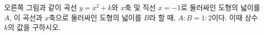\noindent\begin{minipage}[t]{0.58\linewidth}\vspace{0pt}\raggedright 오른쪽 그림과 같이 곡선 $y=x^2+k$와 $x$축 및 직선 $x=-1$로 둘러싸인 도형의 넓이를 $A$, 이 곡선과 $x$축으로 둘러싸인 도형의 넓이를 $B$라 할 때, $A:B=1:2$이다. 이때 상수 $k$의 값을 구하시오.\end{minipage}\hfill\begin{minipage}[t]{0.4\linewidth}\vspace{0pt}\centering \resizebox{\ifdim\width>\linewidth\linewidth\else\width\fi}{!}{}\end{minipage}\par
